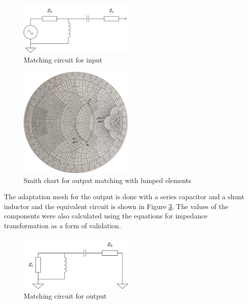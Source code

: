 \begin{figure}[H]
    \centering
    \includegraphics[width=0.5\textwidth]{Images/Input-matching-circuit.png}
    \caption{Matching circuit for input}
    \label{fig:MatchingCircuit-input}
\end{figure}

\begin{figure}[H]
    \centering
    \includegraphics[width=0.5\textwidth]{Images/zl-LC-matching.png}
    \caption{Smith chart for output matching with lumped elements}
    \label{fig:zl-LC-matching}
\end{figure}

The adaptation mesh for the output is done with a series capacitor and a shunt inductor and the equivalent circuit is shown in Figure \ref{fig:MatchingCircuit-output}. The values of the components were also calculated using the equations for impedance transformation as a form of validation.

\begin{figure}[H]
    \centering
    \includegraphics[width=0.5\textwidth]{Images/Ouput-matching-circuit.png}
    \caption{Matching circuit for output}
    \label{fig:MatchingCircuit-output} 
\end{figure}

